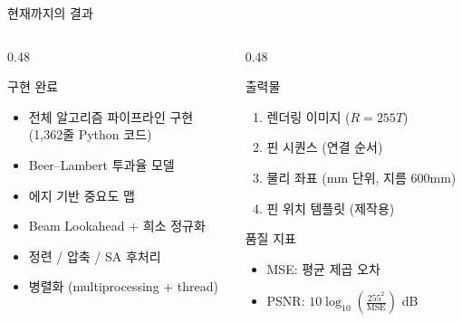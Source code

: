\documentclass[10pt,aspectratio=169]{beamer}
\begin{document}
\begin{frame}{현재까지의 결과}
  \begin{columns}[T]
    \begin{column}{0.48\textwidth}
      \begin{block}{구현 완료}
        \begin{itemize}
          \item 전체 알고리즘 파이프라인 구현\\
                (1,362줄 Python 코드)
          \item Beer--Lambert 투과율 모델
          \item 에지 기반 중요도 맵
          \item Beam Lookahead + 희소 정규화
          \item 정련 / 압축 / SA 후처리
          \item 병렬화 (multiprocessing + thread)
        \end{itemize}
      \end{block}
    \end{column}
    \begin{column}{0.48\textwidth}
      \begin{block}{출력물}
        \begin{enumerate}
          \item 렌더링 이미지 ($R = 255T$)
          \item 핀 시퀀스 (연결 순서)
          \item 물리 좌표 (mm 단위, 지름 600mm)
          \item 핀 위치 템플릿 (제작용)
        \end{enumerate}
      \end{block}

      \vspace{0.1cm}
      \begin{block}{품질 지표}
        \begin{itemize}\setlength\itemsep{0pt}
          \item MSE: 평균 제곱 오차
          \item PSNR: $10\log_{10}\!\left(\frac{255^2}{\text{MSE}}\right)$ dB
        \end{itemize}
      \end{block}
    \end{column}
  \end{columns}
\end{frame}
\end{document}
